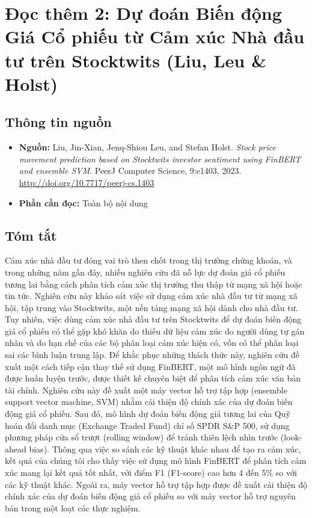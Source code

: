 \chapter{Đọc thêm 2: Dự đoán Biến động Giá Cổ phiếu từ Cảm xúc Nhà đầu tư trên Stocktwits (Liu, Leu \& Holst)}
\label{ch:M4L3DT2}


\section{Thông tin nguồn}

\begin{itemize}
  \item \textbf{Nguồn:} Liu, Jin-Xian, Jenq-Shiou Leu, and Stefan Holst. \emph{Stock price movement prediction based on Stocktwits investor sentiment using FinBERT and ensemble SVM}. PeerJ Computer Science, 9:e1403, 2023. \url{http://doi.org/10.7717/peerj-cs.1403}
  \item \textbf{Phần cần đọc:} Toàn bộ nội dung
\end{itemize}

\section{Tóm tắt}

Cảm xúc nhà đầu tư đóng vai trò then chốt trong thị trường chứng khoán, và trong những năm gần đây, nhiều nghiên cứu đã nỗ lực dự đoán giá cổ phiếu tương lai bằng cách phân tích cảm xúc thị trường thu thập từ mạng xã hội hoặc tin tức. Nghiên cứu này khảo sát việc sử dụng cảm xúc nhà đầu tư từ mạng xã hội, tập trung vào Stocktwits, một nền tảng mạng xã hội dành cho nhà đầu tư. Tuy nhiên, việc dùng cảm xúc nhà đầu tư trên Stocktwits để dự đoán biến động giá cổ phiếu có thể gặp khó khăn do thiếu dữ liệu cảm xúc do người dùng tự gán nhãn và do hạn chế của các bộ phân loại cảm xúc hiện có, vốn có thể phân loại sai các bình luận trung lập. Để khắc phục những thách thức này, nghiên cứu đề xuất một cách tiếp cận thay thế sử dụng FinBERT, một mô hình ngôn ngữ đã được huấn luyện trước, được thiết kế chuyên biệt để phân tích cảm xúc văn bản tài chính. Nghiên cứu này đề xuất một máy vector hỗ trợ tập hợp (ensemble support vector machine, SVM) nhằm cải thiện độ chính xác của dự đoán biến động giá cổ phiếu. Sau đó, mô hình dự đoán biến động giá tương lai của Quỹ hoán đổi danh mục (Exchange Traded Fund) chỉ số SPDR S\&P 500, sử dụng phương pháp cửa sổ trượt (rolling window) để tránh thiên lệch nhìn trước (look-ahead bias). Thông qua việc so sánh các kỹ thuật khác nhau để tạo ra cảm xúc, kết quả của chúng tôi cho thấy việc sử dụng mô hình FinBERT để phân tích cảm xúc mang lại kết quả tốt nhất, với điểm F1 (F1-score) cao hơn 4 đến 5\% so với các kỹ thuật khác. Ngoài ra, máy vector hỗ trợ tập hợp được đề xuất cải thiện độ chính xác của dự đoán biến động giá cổ phiếu so với máy vector hỗ trợ nguyên bản trong một loạt các thực nghiệm.

